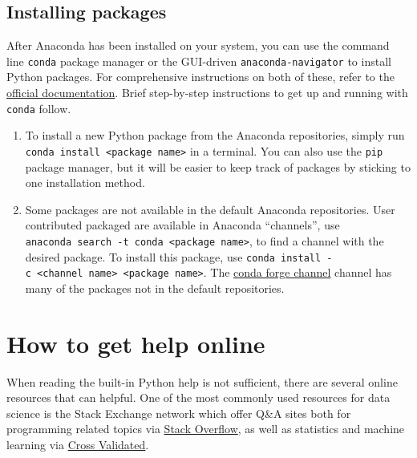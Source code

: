\documentclass[]{Nemilov}
\providecommand{\tightlist}{%
  \setlength{\itemsep}{0pt}\setlength{\parskip}{0pt}}
\begin{document}
\hypertarget{py-dev-installing-packages}{%
\subsection{Installing packages}\label{py-dev-installing-packages}}

After Anaconda has been installed on your system, you can use the command line
\texttt{conda} package manager or the GUI-driven \texttt{anaconda-navigator} to install
Python packages. For comprehensive instructions on both of these, refer to the
\href{https://docs.continuum.io/anaconda/\#navigator-or-conda}{official
documentation}. Brief
step-by-step instructions to get up and running with \texttt{conda} follow.

\begin{enumerate}
\def\labelenumi{\arabic{enumi}.}
\tightlist
\item
  To install a new Python package from the Anaconda repositories, simply run
  \texttt{conda\ install\ \textless{}package\ name\textgreater{}} in a terminal. You can also use the \texttt{pip}
  package manager, but it will be easier to keep track of packages by sticking
  to one installation method.
\item
  Some packages are not available in the default Anaconda repositories. User
  contributed packaged are available in Anaconda ``channels'', use \texttt{anaconda\ search\ -t\ conda\ \textless{}package\ name\textgreater{}}, to find a channel with the desired package.
  To install this package, use \texttt{conda\ install\ -c\ \textless{}channel\ name\textgreater{}\ \textless{}package\ name\textgreater{}}. The \href{https://conda-forge.github.io/}{conda forge channel} channel
  has many of the packages not in the default repositories.
\end{enumerate}

\hypertarget{py-dev-how-to-get-help-online}{%
\section{How to get help online}\label{py-dev-how-to-get-help-online}}

When reading the built-in Python help is not sufficient, there are several
online resources that can helpful. One of the most commonly used resources for
data science is the Stack Exchange network which offer Q\&A sites both for
programming related topics via \href{https://stackoverflow.com/}{Stack Overflow}, as well as statistics and
machine learning via \href{https://stats.stackexchange.com/}{Cross Validated}.
\end{document}
